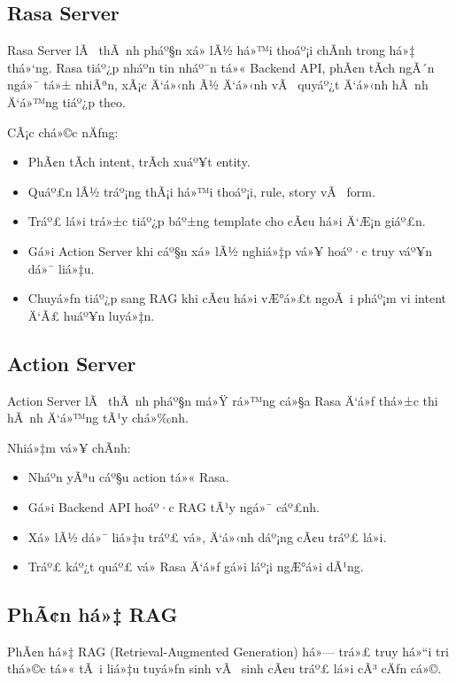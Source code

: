 ﻿\documentclass[12pt,a4paper]{report}
\begin{document}
\subsection{Rasa Server}

Rasa Server lÃ  thÃ nh pháº§n xá»­ lÃ½ há»™i thoáº¡i chÃ­nh trong há»‡ thá»‘ng. Rasa tiáº¿p nháº­n tin nháº¯n tá»« Backend API, phÃ¢n tÃ­ch ngÃ´n ngá»¯ tá»± nhiÃªn, xÃ¡c Ä‘á»‹nh Ã½ Ä‘á»‹nh vÃ  quyáº¿t Ä‘á»‹nh hÃ nh Ä‘á»™ng tiáº¿p theo.

CÃ¡c chá»©c nÄƒng:
\begin{itemize}
    \item PhÃ¢n tÃ­ch intent, trÃ­ch xuáº¥t entity.
    \item Quáº£n lÃ½ tráº¡ng thÃ¡i há»™i thoáº¡i, rule, story vÃ  form.
    \item Tráº£ lá»i trá»±c tiáº¿p báº±ng template cho cÃ¢u há»i Ä‘Æ¡n giáº£n.
    \item Gá»i Action Server khi cáº§n xá»­ lÃ½ nghiá»‡p vá»¥ hoáº·c truy váº¥n dá»¯ liá»‡u.
    \item Chuyá»ƒn tiáº¿p sang RAG khi cÃ¢u há»i vÆ°á»£t ngoÃ i pháº¡m vi intent Ä‘Ã£ huáº¥n luyá»‡n.
\end{itemize}

\subsection{Action Server}

Action Server lÃ  thÃ nh pháº§n má»Ÿ rá»™ng cá»§a Rasa Ä‘á»ƒ thá»±c thi hÃ nh Ä‘á»™ng tÃ¹y chá»‰nh.

Nhiá»‡m vá»¥ chÃ­nh:
\begin{itemize}
    \item Nháº­n yÃªu cáº§u action tá»« Rasa.
    \item Gá»i Backend API hoáº·c RAG tÃ¹y ngá»¯ cáº£nh.
    \item Xá»­ lÃ½ dá»¯ liá»‡u tráº£ vá», Ä‘á»‹nh dáº¡ng cÃ¢u tráº£ lá»i.
    \item Tráº£ káº¿t quáº£ vá» Rasa Ä‘á»ƒ gá»­i láº¡i ngÆ°á»i dÃ¹ng.
\end{itemize}

\subsection{PhÃ¢n há»‡ RAG}

PhÃ¢n há»‡ RAG (Retrieval-Augmented Generation) há»— trá»£ truy há»“i tri thá»©c tá»« tÃ i liá»‡u tuyá»ƒn sinh vÃ  sinh cÃ¢u tráº£ lá»i cÃ³ cÄƒn cá»©.
\end{document}

